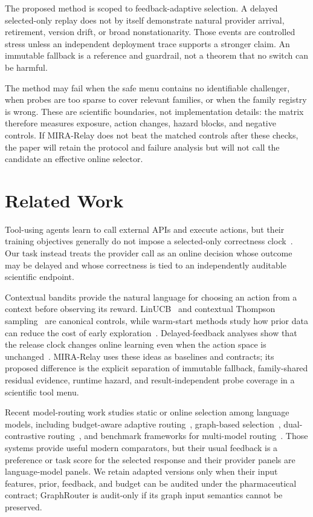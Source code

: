 \documentclass[sigconf,anonymous]{aamas}
\begin{document}
The proposed method is scoped to feedback-adaptive selection. A delayed selected-only replay does not by itself demonstrate natural provider arrival, retirement, version drift, or broad nonstationarity. Those events are controlled stress unless an independent deployment trace supports a stronger claim. An immutable fallback is a reference and guardrail, not a theorem that no switch can be harmful.

The method may fail when the safe menu contains no identifiable challenger, when probes are too sparse to cover relevant families, or when the family registry is wrong. These are scientific boundaries, not implementation details: the matrix therefore measures exposure, action changes, hazard blocks, and negative controls. If MIRA-Relay does not beat the matched controls after these checks, the paper will retain the protocol and failure analysis but will not call the candidate an effective online selector.

\section{Related Work}
Tool-using agents learn to call external APIs and execute actions, but their training objectives generally do not impose a selected-only correctness clock~\cite{schick2023toolformer,yao2023react}. Our task instead treats the provider call as an online decision whose outcome may be delayed and whose correctness is tied to an independently auditable scientific endpoint.

Contextual bandits provide the natural language for choosing an action from a context before observing its reward. LinUCB~\cite{li2010contextual} and contextual Thompson sampling~\cite{agrawal2013thompson} are canonical controls, while warm-start methods study how prior data can reduce the cost of early exploration~\cite{oetomo2023warmstart}. Delayed-feedback analyses show that the release clock changes online learning even when the action space is unchanged~\cite{joulani2013online}. MIRA-Relay uses these ideas as baselines and contracts; its proposed difference is the explicit separation of immutable fallback, family-shared residual evidence, runtime hazard, and result-independent probe coverage in a scientific tool menu.

Recent model-routing work studies static or online selection among language models, including budget-aware adaptive routing~\cite{panda2025pilot}, graph-based selection~\cite{feng2025graphrouter}, dual-contrastive routing~\cite{chen2024routerdc}, and benchmark frameworks for multi-model routing~\cite{hu2024routerbench}. Those systems provide useful modern comparators, but their usual feedback is a preference or task score for the selected response and their provider panels are language-model panels. We retain adapted versions only when their input features, prior, feedback, and budget can be audited under the pharmaceutical contract; GraphRouter is audit-only if its graph input semantics cannot be preserved.
\end{document}
